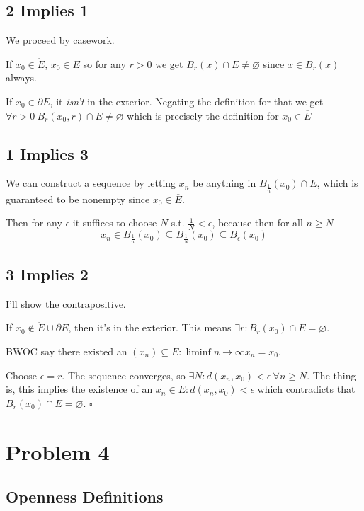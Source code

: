 \documentclass[12pt]{article}
\begin{document}
\subsection{2 Implies 1}

We proceed by casework.

If $x_0 \in \mathring{E}$, $x_0 \in E$ so for any $r > 0$
we get $B_r(x) \cap E \ne \varnothing$ since $x \in B_r(x)$ always.

If $x_0 \in \partial E$, it \textit{isn't} in the exterior.
Negating the definition for that we get $\forall r > 0\ B_r(x_0, r) \cap E \ne \varnothing$
which is precisely the definition for $x_0 \in \overline{E}$

\subsection{1 Implies 3}

We can construct a sequence by letting $x_n$ be anything in $B_{\frac{1}{n}}(x_0) \cap E$,
which is guaranteed to be nonempty since $x_0 \in \overline{E}$.

Then for any $\epsilon$ it suffices to choose $N$ s.t. $\frac{1}{N} < \epsilon$,
because then for all $n \ge N$
\[x_n \in B_{\frac{1}{n}}(x_0) \subseteq B_{\frac{1}{N}}(x_0)\subseteq B_{\epsilon}(x_0)\]

\subsection{3 Implies 2}

I'll show the contrapositive.

If $x_0 \notin \mathring{E} \cup \partial E$, then it's in the exterior.
This means $\exists r: B_r(x_0) \cap E = \varnothing$.

BWOC say there existed an $(x_n) \subseteq E: \liminf{n \to \infty} x_n=x_0$.

Choose $\epsilon = r$.
The sequence converges, so $\exists N: d(x_n, x_0) < \epsilon\ \forall n \ge N$.
The thing is, this implies the existence of an $x_n \in E: d(x_n, x_0) < \epsilon$
which contradicts that $B_r(x_0) \cap E = \varnothing$. $\square$

\section{Problem 4}

\subsection{Openness Definitions}
\end{document}

